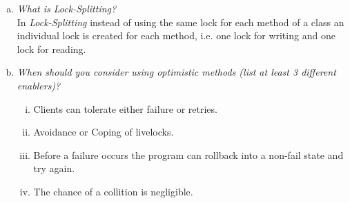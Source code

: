 \documentclass{report}
\begin{document}
\begin{enumerate}[a)]
			\item \textit{What is Lock-Splitting?} \\
			In \textit{Lock-Splitting} instead of using the same lock for each method of a class an individual lock is created for each method, i.e. one lock for writing and one lock for reading.
			\item \textit{When should you consider using optimistic methods (list at least 3 different enablers)?}
			\begin{enumerate}[(i)]
				\item Clients can tolerate either failure or retries.
				\item Avoidance or Coping of livelocks.
				\item Before a failure occurs the program can rollback into a non-fail state and try again.
				\item The chance of a collition is negligible.
			\end{enumerate}
		\end{enumerate}
	\closesection
	
	\newpage
	\setcounter{section}{2}	
\end{document}
